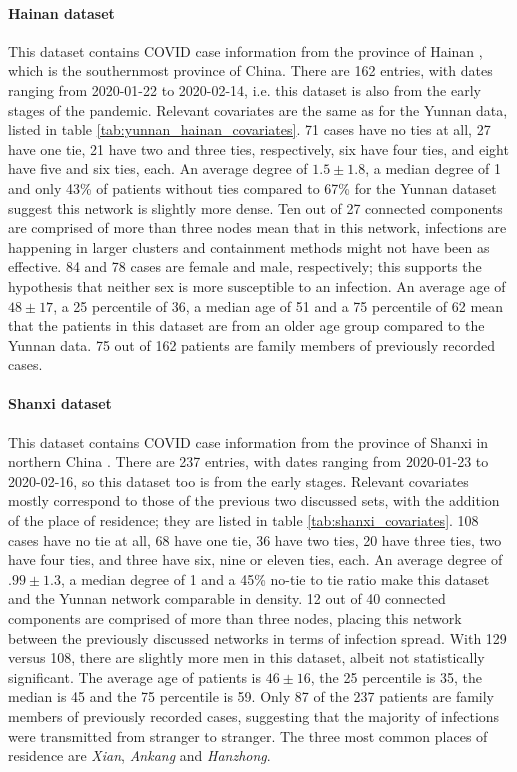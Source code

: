\documentclass{article}
\begin{document}
	\paragraph{Hainan dataset} This dataset contains COVID case information from the province of Hainan \cite{hainan_data}, which is the southernmost province of China. There are 162 entries, with dates ranging from 2020-01-22 to 2020-02-14, i.e. this dataset is also from the early stages of the pandemic. Relevant covariates are the same as for the Yunnan data, listed in table \ref{tab:yunnan_hainan_covariates}. 71 cases have no ties at all, 27 have one tie, 21 have two and three ties, respectively, six have four ties, and eight have five and six ties, each. An average degree of $1.5\pm1.8$, a median degree of 1 and only 43\% of patients without ties compared to 67\% for the Yunnan dataset suggest this network is slightly more dense. Ten out of 27 connected components are comprised of more than three nodes mean that in this network, infections are happening in larger clusters and containment methods might not have been as effective. 84 and 78 cases are female and male, respectively; this supports the hypothesis that neither sex is more susceptible to an infection. An average age of $48\pm17$, a 25 percentile of 36, a median age of 51 and a 75 percentile of 62 mean that the patients in this dataset are from an older age group compared to the Yunnan data. 75 out of 162 patients are family members of previously recorded cases.
	
	\paragraph{Shanxi dataset} This dataset contains COVID case information from the province of Shanxi in northern China \cite{shanxi_data}. There are 237 entries, with dates ranging from 2020-01-23 to 2020-02-16, so this dataset too is from the early stages. Relevant covariates mostly correspond to those of the previous two discussed sets, with the addition of the place of residence; they are listed in table \ref{tab:shanxi_covariates}. 108 cases have no tie at all, 68 have one tie, 36 have two ties, 20 have three ties, two have four ties, and three have six, nine or eleven ties, each. An average degree of $.99\pm1.3$, a median degree of 1 and a 45\% no-tie to tie ratio make this dataset and the Yunnan network comparable in density. 12 out of 40 connected components are comprised of more than three nodes, placing this network between the previously discussed networks in terms of infection spread. With 129 versus 108, there are slightly more men in this dataset, albeit not statistically significant. The average age of patients is $46\pm16$, the 25 percentile is 35, the median is 45 and the 75 percentile is 59. Only 87 of the 237 patients are family members of previously recorded cases, suggesting that the majority of infections were transmitted from stranger to stranger. The three most common places of residence are \emph{Xian}, \emph{Ankang} and \emph{Hanzhong}.
	
\end{document}
